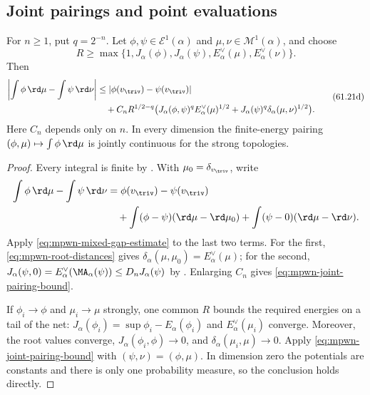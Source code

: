 \subsection{Joint pairings and point evaluations}
\label{subsec:mpwn-strong-pairings}

\begin{corollary}\label{cor:mpwn-strong-pairing}
For $n\geq1$, put $q=2^{-n}$. Let $\phi,\psi\in\mathcal E^1(\alpha)$ and $\mu,\nu\in\mathcal M^1(\alpha)$, and choose
\[
 R\geq\max\{1,J_\alpha(\phi),J_\alpha(\psi),
                   E_\alpha^\vee(\mu),E_\alpha^\vee(\nu)\}.
\]
Then
\[
 \begin{split}
 \left|\int\phi\,\rd\mu-\int\psi\,\rd\nu\right|
 &\leq |\phi(v_{\triv})-\psi(v_{\triv})|\\
 &\quad+C_n R^{1/2-q}\bigl(
      J_\alpha(\phi,\psi)^q E_\alpha^\vee(\mu)^{1/2}
      +J_\alpha(\psi)^q\delta_\alpha(\mu,\nu)^{1/2}\bigr).
 \end{split}
\tag{61.21d}\label{eq:mpwn-joint-pairing-bound}
\]
Here $C_n$ depends only on $n$. In every dimension the finite-energy pairing $(\phi,\mu)\mapsto\int\phi\,\rd\mu$ is jointly continuous for the strong topologies.
\end{corollary}

\begin{proof}
Every integral is finite by . With $\mu_0=\delta_{v_{\triv}}$, write
\[
 \begin{split}
 \int\phi\,\rd\mu-\int\psi\,\rd\nu
 &=\phi(v_{\triv})-\psi(v_{\triv})\\
 &\quad+\int(\phi-\psi)(\rd\mu-\rd\mu_0)
        +\int(\psi-0)(\rd\mu-\rd\nu).
 \end{split}
\]
Apply \eqref{eq:mpwn-mixed-gap-estimate} to the last two terms. For the first, \eqref{eq:mpwn-root-distances} gives $\delta_\alpha(\mu,\mu_0)=E_\alpha^\vee(\mu)$; for the second, $J_\alpha(\psi,0)=E_\alpha^\vee(\MA_\alpha(\psi))\leq D_nJ_\alpha(\psi)$ by . Enlarging $C_n$ gives \eqref{eq:mpwn-joint-pairing-bound}.

If $\phi_i\to\phi$ and $\mu_i\to\mu$ strongly, one common $R$ bounds the required energies on a tail of the net: $J_\alpha(\phi_i)=\sup\phi_i-E_\alpha(\phi_i)$ and $E_\alpha^\vee(\mu_i)$ converge. Moreover, the root values converge, $J_\alpha(\phi_i,\phi)\to0$, and $\delta_\alpha(\mu_i,\mu)\to0$. Apply \eqref{eq:mpwn-joint-pairing-bound} with $(\psi,\nu)=(\phi,\mu)$. In dimension zero the potentials are constants and there is only one probability measure, so the conclusion holds directly.
\end{proof}

